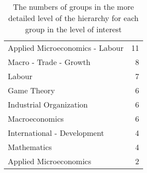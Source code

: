 \begin{table}[tb]
\centering
\caption[Subgroups]{The numbers of groups in the more detailed level of the hierarchy for each group in the level of interest}
\label{tab:subgroups}
\begin{tabular}{lr}
\toprule
Applied Microeconomics - Labour &  11 \\
Macro - Trade - Growth          &   8 \\
Labour                          &   7 \\
Game Theory                     &   6 \\
Industrial Organization         &   6 \\
Macroeconomics                  &   6 \\
International - Development     &   4 \\
Mathematics                     &   4 \\
Applied Microeconomics          &   2 \\
\bottomrule
\end{tabular}
\end{table}
